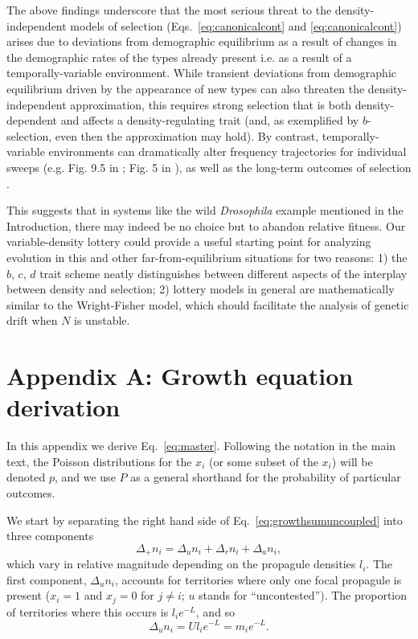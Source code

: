 \documentclass[12pt]{article}
\begin{document}
The above findings underscore that the most serious threat to the density-independent models of selection (Eqs.~\eqref{eq:canonicalcont} and \eqref{eq:canonicalcont}) arises due to deviations from demographic equilibrium as a result of changes in the demographic rates of the types already present i.e. as a result of a temporally-variable environment. While transient deviations from demographic equilibrium driven by the appearance of new types can also threaten the density-independent approximation, this requires strong selection that is both density-dependent and affects a density-regulating trait (and, as exemplified by $b$-selection, even then the approximation may hold). By contrast, temporally-variable environments can dramatically alter frequency trajectories for individual sweeps (e.g. Fig. 9.5 in \cite{otto_2011}; Fig. 5 in \cite{mallet_2012}), as well as the long-term outcomes of selection \citep{lande_2009}. 

This suggests that in systems like the wild \textit{Drosophila} example mentioned in the Introduction, there may indeed be no choice but to abandon relative fitness. Our variable-density lottery could provide a useful starting point for analyzing evolution in this and other far-from-equilibrium situations for two reasons: 1) the $b$, $c$, $d$ trait scheme neatly distinguishes between different aspects of the interplay between density and selection; 2) lottery models in general are mathematically similar to the Wright-Fisher model, which should facilitate the analysis of genetic drift when $N$ is unstable.


 

\section*{Appendix A: Growth equation derivation}

In this appendix we derive Eq.~\eqref{eq:master}. Following the notation in the main text, the Poisson distributions for the $x_i$ (or some subset of the $x_i$) will be denoted $p$, and we use $P$ as a general shorthand for the probability of particular outcomes.

We start by separating the right hand side of Eq.~\eqref{eq:growthsumuncoupled} into three components
\begin{equation}
\Delta_+ n_i = \Delta_u n_i+\Delta_r n_i+\Delta_a n_i,\label{eq:delt_decomp}
\end{equation}
which vary in relative magnitude depending on the propagule densities $l_i$. The first component, $\Delta_u n_i$, accounts for territories where only one focal propagule is present ($x_i=1$ and $x_j=0$ for $j\neq i$; $u$ stands for ``uncontested''). The proportion of territories where this occurs is $l_i e^{-L}$, and so 
\begin{equation}
\Delta_u n_i=Ul_i e^{-L}=m_i e^{-L}.
\end{equation}
\end{document}

